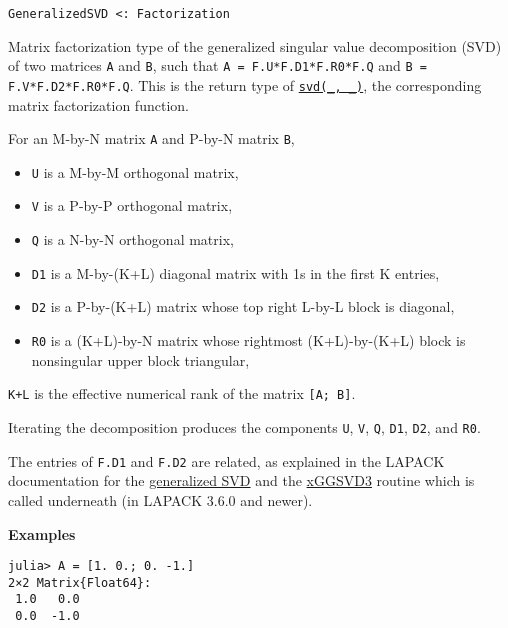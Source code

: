 \begin{adjustwidth}{2em}{0pt}


\begin{verbatim}
GeneralizedSVD <: Factorization
\end{verbatim}

Matrix factorization type of the generalized singular value decomposition (SVD) of two matrices \texttt{A} and \texttt{B}, such that \texttt{A = F.U*F.D1*F.R0*F.Q{\textquotesingle}} and \texttt{B = F.V*F.D2*F.R0*F.Q{\textquotesingle}}. This is the return type of \hyperlink{6661056220970412040}{\texttt{svd(\_, \_)}}, the corresponding matrix factorization function.

For an M-by-N matrix \texttt{A} and P-by-N matrix \texttt{B},

\begin{itemize}
\item \texttt{U} is a M-by-M orthogonal matrix,


\item \texttt{V} is a P-by-P orthogonal matrix,


\item \texttt{Q} is a N-by-N orthogonal matrix,


\item \texttt{D1} is a M-by-(K+L) diagonal matrix with 1s in the first K entries,


\item \texttt{D2} is a P-by-(K+L) matrix whose top right L-by-L block is diagonal,


\item \texttt{R0} is a (K+L)-by-N matrix whose rightmost (K+L)-by-(K+L) block is          nonsingular upper block triangular,

\end{itemize}
\texttt{K+L} is the effective numerical rank of the matrix \texttt{[A; B]}.

Iterating the decomposition produces the components \texttt{U}, \texttt{V}, \texttt{Q}, \texttt{D1}, \texttt{D2}, and \texttt{R0}.

The entries of \texttt{F.D1} and \texttt{F.D2} are related, as explained in the LAPACK documentation for the \href{http://www.netlib.org/lapack/lug/node36.html}{generalized SVD} and the \href{http://www.netlib.org/lapack/explore-html/d6/db3/dggsvd3\_8f.html}{xGGSVD3} routine which is called underneath (in LAPACK 3.6.0 and newer).

\textbf{Examples}


\begin{verbatim}
julia> A = [1. 0.; 0. -1.]
2×2 Matrix{Float64}:
 1.0   0.0
 0.0  -1.0


\end{verbatim}
\end{adjustwidth}
